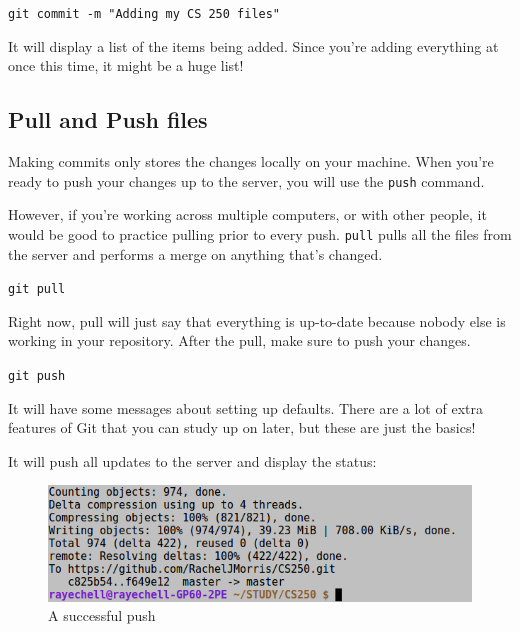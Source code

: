 \documentclass[a4paper,12pt,oneside]{book}
\begin{document}
        \begin{center}
            \texttt{git commit -m "Adding my CS 250 files"}
        \end{center}

        It will display a list of the items being added. Since you're
        adding everything at once this time, it might be a huge list!

    \newpage

        \subsection{Pull and Push files}

        Making commits only stores the changes locally on your machine.
        When you're ready to push your changes up to the server, you will
        use the \texttt{push} command.

        However, if you're working across multiple computers, or with other people,
        it would be good to practice pulling prior to every push.
        \texttt{pull} pulls all the files from the server and performs
        a merge on anything that's changed.

        \begin{center}
            \texttt{git pull}
        \end{center}

        Right now, pull will just say that everything is up-to-date
        because nobody else is working in your repository. After the
        pull, make sure to push your changes.

        \begin{center}
            \texttt{git push}
        \end{center}

        It will have some messages about setting up defaults. There are
        a lot of extra features of Git that you can study up on later,
        but these are just the basics!

        It will push all updates to the server and display the status:
        
        \begin{figure}[h]
            \centering
            \includegraphics[width=14cm]{images/git-pushed.png}
            \caption{A successful push}
        \end{figure}
        
\end{document}
